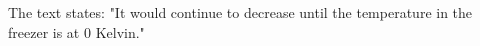 The text states: "It would continue to decrease until the temperature in the freezer is at 0 Kelvin."